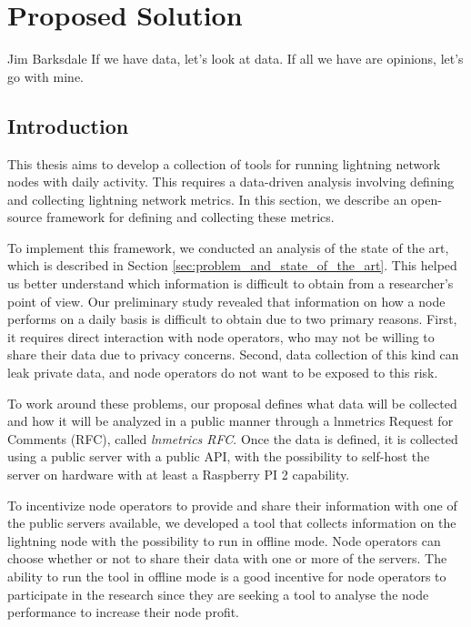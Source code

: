\chapter{Proposed Solution}\label{chap:propsol}

\begin{chapquote}{Jim Barksdale}
If we have data, let’s look at data. If all we have are opinions, let’s go with mine.
\end{chapquote}

\section{Introduction}

This thesis aims to develop a collection of tools for running lightning network 
nodes with daily activity. This requires a data-driven analysis involving defining 
and collecting lightning network metrics. In this section, we describe an open-source 
framework for defining and collecting these metrics.

To implement this framework, we conducted an analysis of the state of the art, 
which is described in Section \ref{sec:problem_and_state_of_the_art}. This helped us 
better understand which information is difficult to obtain from a researcher's point 
of view. Our preliminary study revealed that information on how a node performs on a 
daily basis is difficult to obtain due to two primary reasons. First, it requires direct 
interaction with node operators, who may not be willing to share their data due to 
privacy concerns. Second, data collection of this kind can leak private data, 
and node operators do not want to be exposed to this risk.

To work around these problems, our proposal defines what data will be collected 
and how it will be analyzed in a public manner through a lnmetrics Request for Comments (RFC), 
called \emph{lnmetrics RFC}. Once the data is defined, it is collected using a public 
server with a public API, with the possibility to self-host the server on hardware 
with at least a Raspberry PI 2 capability.

To incentivize node operators to provide and share their information with one
of the public servers available, we developed a tool that collects information on 
the lightning node with the possibility to run in offline mode. Node operators can 
choose whether or not to share their data with one or more of the servers. The ability 
to run the tool in offline mode is a good incentive for node operators to participate 
in the research since they are seeking a tool to analyse the node performance to 
increase their node profit.

